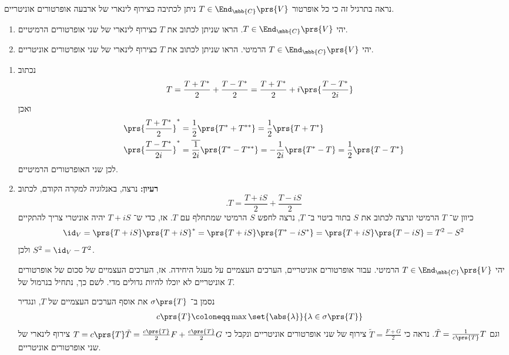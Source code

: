 \documentclass[a4paper,10pt,twoside,openany]{book}
\begin{document}
\begin{exercisechap}
נראה בתרגיל זה כי כל אופרטור
$T \in \End_{\mbb{C}}\prs{V}$
ניתן לכתיבה כצירוף לינארי של ארבעה אופרטורים אוניטריים.

\begin{enumerate}
    \item יהי
    $T \in \End_{\mbb{C}}\prs{V}$.
    הראו שניתן לכתוב את
    $T$
    כצירוף לינארי של שני אופרטורים הרמיטיים.
    \item יהי
    $T \in \End_{\mbb{C}}\prs{V}$
    הרמיטי. הראו שניתן לכתוב את
    $T$
    כצירוף לינארי של שני אופרטורים אוניטריים.
\end{enumerate}
\end{exercisechap}

\begin{solution}
\begin{enumerate}
    \item נכתוב
    \begin{align*}
        T &= \frac{T + T^*}{2} + \frac{T - T^*}{2} = \frac{T + T^*}{2} + i \prs{\frac{T - T^*}{2i}}
    \end{align*}
    ואכן
    \begin{align*}
        \prs{\frac{T+T^*}{2}}^* &= \frac{1}{2} \prs{T^* + T^{**}} = \frac{1}{2} \prs{T + T^*} \\
        \prs{\frac{T - T^*}{2i}}^* &= \overline{\frac{1}{2i}} \prs{T^* - T^{**}} = -\frac{1}{2i} \prs{T^* - T} = \frac{1}{2} \prs{T - T^*}
    \end{align*}
    לכן שני האופרטורים הרמיטיים.

    \item
    \textbf{רעיון:}
    נרצה, באנלוגיה למקרה הקודם, לכתוב
    \[\text{.} T = \frac{T + i S}{2} + \frac{T - i S}{2}\]
    כיוון ש־%
    $T$
    הרמיטי ונרצה לכתוב את
    $S$
    בתור ביטוי ב־%
    $T$,
    נרצה לחפש
    $S$
    הרמיטי שמתחלף עם
    $T$.
    אז, כדי ש־%
    $T + i S$
    יהיה אוניטרי צריך להתקיים
\[\id_V = \prs{T+iS}\prs{T+iS}^* = \prs{T+iS}\prs{T^* - i S^*} = \prs{T+iS}\prs{T-iS} = T^2 - S^2\]
    ולכן
    $S^2 = \id_V - T^2$.
    
    יהי
    $T \in \End_{\mbb{C}}\prs{V}$
    הרמיטי.
    עבור אופרטורים אוניטריים, הערכים העצמיים על מעגל היחידה. אז, הערכים העצמיים של סכום של אופרטורים אוניטריים לא יוכלו להיות גדולים מדי. לשם כך, נתחיל בנרמול של
    $T$.
    
    נסמן ב־%
    $\sigma\prs{T}$
    את אוסף הערכים העצמיים של
    $T$,
    ונגדיר
    \begin{align*}
        c\prs{T} &\coloneqq \max\set{\abs{\lambda}}{\lambda \in \sigma\prs{T}}
    \end{align*}
    וגם
    $\tilde{T} = \frac{1}{c\prs{T}} T$.
    נראה כי
    $\tilde{T} = \frac{F + G}{2}$
    צירוף של שני אופרטורים אוניטריים ונקבל כי
    $T = c\prs{T} \tilde{T} = \frac{c\prs{T}}{2} F + \frac{c\prs{T}}{2} G$
    צירוף לינארי של שני אופרטורים אוניטריים.
    

\end{enumerate}
\end{solution}
\end{document}

